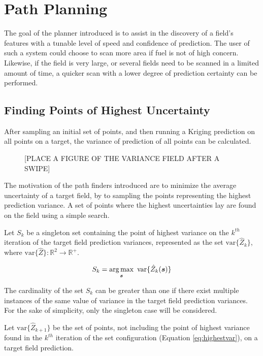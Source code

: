 \chapter{Path Planning}
The goal of the planner introduced is to assist in the discovery of a field's features with a tunable level of speed and confidence of prediction. The user of such a system could choose to scan more area if fuel is not of high concern. Likewise, if the field is very large, or several fields need to be scanned in a limited amount of time, a quicker scan with a lower degree of prediction certainty can be performed.

\section{Finding Points of Highest Uncertainty} \label{sec:highestvars}
After sampling an initial set of points, and then running a Kriging prediction on all points on a target, the variance of prediction of all points can be calculated.

\begin{figure}
	\centering
	\caption{[PLACE A FIGURE OF THE VARIANCE FIELD AFTER A SWIPE]}
\end{figure}

The motivation of the path finders introduced are to minimize the average uncertainty of a target field, by to sampling the points representing the highest prediction variance. A set of points where the highest uncertainties lay are found on the field using a simple search.

Let $S_k$ be a singleton set containing the point of highest variance on the $k^{th}$ iteration of the target field prediction variances, represented as the set $\text{var}\{\hat{Z}_k\}$, where $\text{var}\{\hat{Z}\} : \mathbb{R}^2 \to \mathbb{R}^+$.

\begin{equation}
	S_{k} = \argmax_{\vect{s}} \ \text{var}\{\hat{Z}_{k}(\vect{s})\}
	\label{eq:highestvar}
\end{equation}

The cardinality of the set $S_k$ can be greater than one if there exist multiple instances of the same value of variance in the target field prediction variances. For the sake of simplicity, only the singleton case will be considered.

Let $\text{var}\{\hat{Z}_{k+1}\}$ be the set of points, not including the point of highest variance found in the $k^{th}$ iteration of the set configuration (Equation \ref{eq:highestvar}), on a target field prediction.


